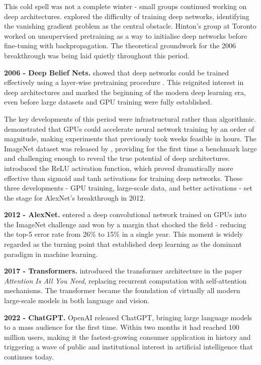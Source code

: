 This cold spell was not a complete winter - small groups continued working on deep architectures. \cite{bengio2004representation} explored the difficulty of training deep networks, identifying the vanishing gradient problem as the central obstacle. Hinton's group at Toronto worked on unsupervised pretraining as a way to initialise deep networks before fine-tuning with backpropagation. The theoretical groundwork for the 2006 breakthrough was being laid quietly throughout this period.

\textbf{2006 - Deep Belief Nets.} \cite{hinton2006belief} showed that deep networks could be trained effectively using a layer-wise pretraining procedure . This reignited interest in deep architectures and marked the beginning of the modern deep learning era, even before large datasets and GPU training were fully established.

The key developments of this period were infrastructural rather than algorithmic. \cite{raina2009gpu} demonstrated that GPUs could accelerate neural network training by an order of magnitude, making experiments that previously took weeks feasible in hours. The ImageNet dataset was released by \cite{deng2009imagenet}, providing for the first time a benchmark large and challenging enough to reveal the true potential of deep architectures. \cite{nair2010relu} introduced the ReLU activation function, which proved dramatically more effective than sigmoid and tanh activations for training deep networks. These three developments - GPU training, large-scale data, and better activations - set the stage for AlexNet's breakthrough in 2012.

\textbf{2012 - AlexNet.} \cite{krizhevsky2012alexnet} entered a deep convolutional network trained on GPUs into the ImageNet challenge and won by a margin that shocked the field - reducing the top-5 error rate from 26\% to 15\% in a single year. This moment is widely regarded as the turning point that established deep learning as the dominant paradigm in machine learning.

\textbf{2017 - Transformers.} \cite{vaswani2017attention} introduced the transformer architecture in the paper \textit{Attention Is All You Need}, replacing recurrent computation with self-attention mechanisms. The transformer became the foundation of virtually all modern large-scale models in both language and vision.

\textbf{2022 - ChatGPT.} OpenAI released ChatGPT, bringing large language models to a mass audience for the first time. Within two months it had reached 100 million users, making it the fastest-growing consumer application in history and triggering a wave of public and institutional interest in artificial intelligence that continues today.

